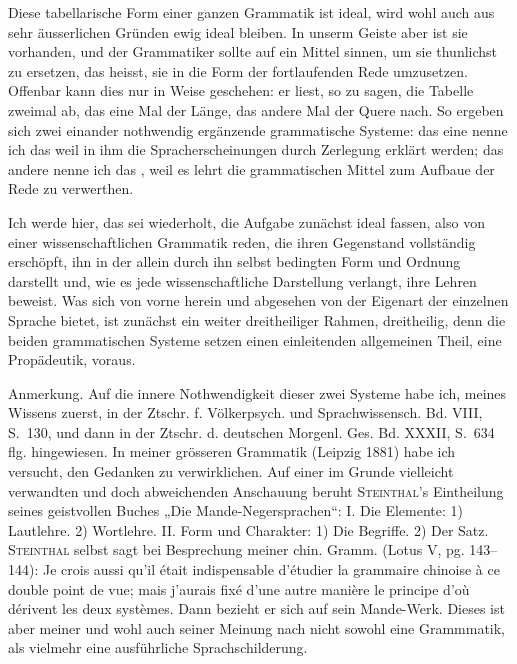 Diese tabellarische Form einer ganzen Grammatik ist ideal, wird wohl auch aus sehr äusserlichen Gründen ewig ideal bleiben. In unserm Geiste aber ist sie vorhanden, und der Grammatiker sollte auf ein Mittel sinnen, um sie thunlichst zu ersetzen, das heisst, sie in die Form der fortlaufenden Rede umzusetzen. Offenbar kann dies nur in  Weise geschehen: er liest, so zu sagen, die Tabelle zweimal ab, das eine Mal der Länge, das andere Mal der Quere nach. So ergeben sich zwei einander nothwendig ergänzende grammatische Systeme: das eine nenne ich das  weil in ihm die Spracherscheinungen durch Zerlegung erklärt werden; das andere nenne ich das , weil es lehrt die grammatischen Mittel zum Aufbaue der Rede zu verwerthen.

\label{sp.86}

Ich werde hier, das sei wiederholt, die Aufgabe zunächst ideal fassen, also von einer wissenschaftlichen Grammatik reden, die ihren Gegenstand vollständig erschöpft, ihn in der allein durch ihn selbst bedingten Form und Ordnung darstellt und, wie es jede wissenschaftliche Darstellung verlangt, ihre Lehren beweist. Was sich von vorne herein und abgesehen von der Eigenart der einzelnen Sprache bietet, ist zunächst ein weiter dreitheiliger Rahmen, dreitheilig, denn die beiden grammatischen Systeme setzen einen einleitenden allgemeinen Theil, eine Propädeutik, voraus.

\begin{styleAnmerk}
Anmerkung. Auf die innere Nothwendigkeit dieser zwei Systeme habe ich, meines Wissens zuerst, in der Ztschr. f. Völkerpsych. und Sprachwissensch. Bd. VIII, S.~130, und dann in der Ztschr. d. deutschen Morgenl. Ges. Bd. XXXII, S.~634 flg. hingewiesen. In meiner grösseren  Grammatik (Leipzig 1881) habe ich versucht, den Gedanken zu verwirklichen. Auf einer im Grunde vielleicht verwandten und doch abweichenden Anschauung beruht \textsc{Steinthal}’s Eintheilung seines geistvollen Buches „Die Mande-Negersprachen“: I. Die Elemente: 1) Lautlehre. 2) Wortlehre. II. Form und Charakter: 1) Die Begriffe. 2) Der Satz. \textsc{Steinthal} \label{fp.88} selbst sagt bei Besprechung meiner chin. Gramm. (Lotus V, pg. 143–144): Je crois aussi qu’il était indispensable d’étudier la grammaire chinoise à ce double point de vue; mais j’aurais fixé d’une autre manière le principe d’où dérivent les deux systèmes. Dann bezieht er sich auf sein Mande-Werk. Dieses ist aber meiner und wohl auch seiner Meinung nach nicht sowohl eine Grammmatik, als vielmehr eine ausführliche Sprachschilderung.
\end{styleAnmerk}

